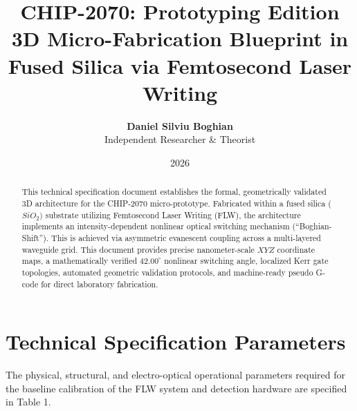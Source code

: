 \documentclass[11pt,a4paper]{article}
\title{\textbf{CHIP-2070: Prototyping Edition}\\ \Large 3D Micro-Fabrication Blueprint in Fused Silica via Femtosecond Laser Writing}
\author{\textbf{Daniel Silviu Boghian} \\ \small Independent Researcher \& Theorist}
\date{2026}
\begin{document}
\maketitle

\begin{abstract}
This technical specification document establishes the formal, geometrically validated 3D architecture for the CHIP-2070 micro-prototype. Fabricated within a fused silica ($SiO_{2})$ substrate utilizing Femtosecond Laser Writing (FLW), the architecture implements an intensity-dependent nonlinear optical switching mechanism (``Boghian-Shift''). This is achieved via asymmetric evanescent coupling across a multi-layered waveguide grid. This document provides precise nanometer-scale $XYZ$ coordinate maps, a mathematically verified $42.00^\circ$ nonlinear switching angle, localized Kerr gate topologies, automated geometric validation protocols, and machine-ready pseudo G-code for direct laboratory fabrication.
\end{abstract}

\vspace{0.5cm}
\tableofcontents
\newpage

\section{Technical Specification Parameters}
The physical, structural, and electro-optical operational parameters required for the baseline calibration of the FLW system and detection hardware are specified in Table 1.
\end{document}

